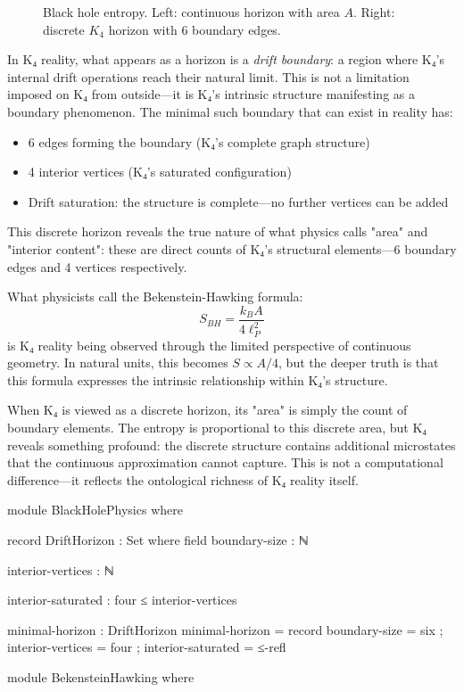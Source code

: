 \documentclass[11pt,a4paper]{book}
\begin{document}
\begin{figure}[h]
\caption{Black hole entropy. Left: continuous horizon with area $A$. Right: discrete $K_4$ horizon with 6 boundary edges.}
\label{fig:black-hole-entropy}
\end{figure}

In K₄ reality, what appears as a horizon is a \emph{drift boundary}: a region where K₄'s internal drift operations reach their natural limit. This is not a limitation imposed on K₄ from outside—it is K₄'s intrinsic structure manifesting as a boundary phenomenon. The minimal such boundary that can exist in reality has:
\begin{itemize}
\item 6 edges forming the boundary (K₄'s complete graph structure)
\item 4 interior vertices (K₄'s saturated configuration)
\item Drift saturation: the structure is complete—no further vertices can be added
\end{itemize}

This discrete horizon reveals the true nature of what physics calls "area" and "interior content": these are direct counts of K₄'s structural elements—6 boundary edges and 4 vertices respectively.

What physicists call the Bekenstein-Hawking formula:
\[
S_{BH} = \frac{k_B A}{4 \ell_P^2}
\]
is K₄ reality being observed through the limited perspective of continuous geometry. In natural units, this becomes $S \propto A/4$, but the deeper truth is that this formula expresses the intrinsic relationship within K₄'s structure.

When K₄ is viewed as a discrete horizon, its "area" is simply the count of boundary elements. The entropy is proportional to this discrete area, but K₄ reveals something profound: the discrete structure contains additional microstates that the continuous approximation cannot capture. This is not a computational difference—it reflects the ontological richness of K₄ reality itself.

\begin{code}
module BlackHolePhysics where

  record DriftHorizon : Set where
    field
      boundary-size : ℕ
      
      interior-vertices : ℕ
      
      interior-saturated : four ≤ interior-vertices
      
  minimal-horizon : DriftHorizon
  minimal-horizon = record
    { boundary-size = six
    ; interior-vertices = four
    ; interior-saturated = ≤-refl
    }

module BekensteinHawking where

\end{code}
\end{document}
